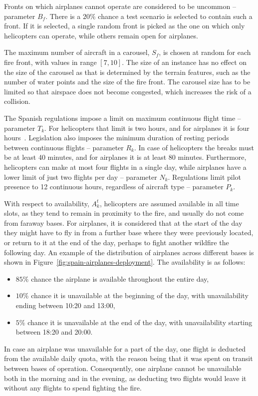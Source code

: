 Fronts on which airplanes cannot operate are considered to be uncommon -- parameter $B_f$.
There is a $20\%$ chance a test scenario is selected to contain such a front.
If it is selected, a single random front is picked as the one on which only helicopters can operate, while others remain open for airplanes.

The maximum number of aircraft in a carousel, $S_f$, is chosen at random for each fire front, with values in range $[7, 10]$.
The size of an instance has no effect on the size of the carousel as that is determined by the terrain features, such as the number of water points and the size of the fire front.
The carousel size has to be limited so that airspace does not become congested, which increases the risk of a collision.

The Spanish regulations impose a limit on maximum continuous flight time -- parameter $T_k$.
For helicopters that limit is two hours, and for airplanes it is four hours~\cite{Spain/AnnexCircular}.
Legislation also imposes the minimum duration of resting periods between continuous flights -- parameter $R_k$.
In case of helicopters the breaks must be at least 40 minutes, and for airplanes it is at least 80 minutes.
Furthermore, helicopters can make at most four flights in a single day, while airplanes have a lower limit of just two flights per day -- parameter $N_k$.
Regulations limit pilot presence to 12 continuous hours, regardless of aircraft type -- parameter $P_k$.

With respect to availability, $A_k^t$, helicopters are assumed available in all time slots, as they tend to remain in proximity to the fire, and usually do not come from faraway bases.
For airplanes, it is considered that at the start of the day they might have to fly in from a further base where they were previously located, or return to it at the end of the day, perhaps to fight another wildfire the following day.
An example of the distribution of airplanes across different bases is shown in Figure~\ref{fig:spain-airplanes-deployment}.
The availability is as follows:
\begin{itemize}
    \item $85\%$ chance the airplane is available throughout the entire day,
    \item $10\%$ chance it is unavailable at the beginning of the day, with unavailability ending between 10:20 and 13:00,
    \item $5\%$ chance it is unavailable at the end of the day, with unavailability starting between 18:20 and 20:00.
\end{itemize}
In case an airplane was unavailable for a part of the day, one flight is deducted from the available daily quota, with the reason being that it was spent on transit between bases of operation.
Consequently, one airplane cannot be unavailable both in the morning and in the evening, as deducting two flights would leave it without any flights to spend fighting the fire.

